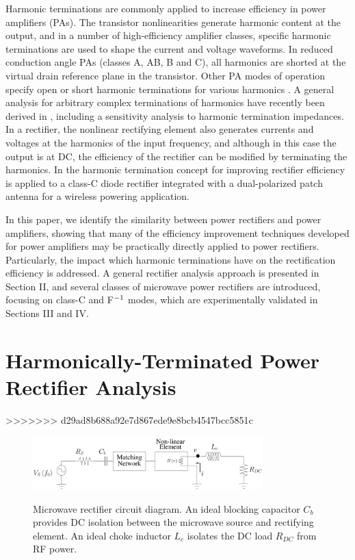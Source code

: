 \documentclass[journal]{IEEEtran}
\begin{document}
Harmonic terminations are commonly applied to increase efficiency in power amplifiers (PAs). The transistor nonlinearities generate harmonic content at the output, and in a number of high-efficiency amplifier classes, specific harmonic terminations are used to shape the current and voltage waveforms. In reduced conduction angle PAs (classes A, AB, B and C), all harmonics are shorted at the virtual drain reference plane in the transistor. Other PA modes of operation specify open or short harmonic terminations for various harmonics \cite{raab01_finiteharmonics, raab02_PAoverview, kee_rutledge}. A general analysis for arbitrary complex terminations of harmonics have recently been derived in \cite{roberg2011}, including a sensitivity analysis to harmonic termination impedances. In a rectifier, the nonlinear rectifying element also generates currents and voltages at the harmonics of the input frequency, and although in this case the output is at DC, the efficiency of the rectifier can be modified by terminating the harmonics. In \cite{robergIMS2012} the harmonic termination concept for improving rectifier efficiency is applied to a class-C diode rectifier integrated with a dual-polarized patch antenna for a wireless powering application.

In this paper, we identify the similarity between power rectifiers and power amplifiers, showing that many of the efficiency improvement techniques developed for power amplifiers may be practically directly applied to power rectifiers. Particularly, the impact which harmonic terminations have on the rectification efficiency is addressed. A general rectifier analysis approach is presented in Section II, and several classes of microwave power rectifiers are introduced, focusing on class-C and F$^{\rm -1}$ modes, which are experimentally validated in Sections III and IV.


\section{Harmonically-Terminated Power Rectifier Analysis}


>>>>>>> d29ad8b688a92e7d867ede9e8bcb4547bcc5851c
\begin{figure}
  \begin{center}
  \includegraphics[width=3.5in]{pdf/01.pdf}\\
  \caption{Microwave rectifier circuit diagram. An ideal blocking capacitor $C_b$ provides DC isolation between the microwave source and rectifying element.  An ideal choke inductor $L_c$ isolates the DC load $R_{DC}$ from RF power.}\label{circuit_diagram}
  \end{center}
\end{figure}
\end{document}
